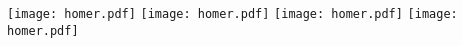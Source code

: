 \texttt{[image: homer.pdf]}
\texttt{[image: homer.pdf]}
\texttt{[image: homer.pdf]}
\texttt{[image: homer.pdf]}
